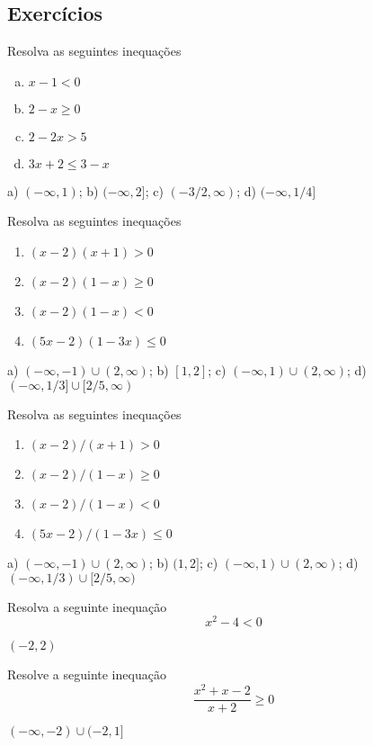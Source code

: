 \subsection*{Exercícios}

\begin{exer}
  Resolva as seguintes inequações
  \begin{enumerate}[a)]
  \item $x - 1 < 0$
  \item $2 - x \geq 0$
  \item $2 - 2x > 5$
  \item $3x + 2 \leq 3 - x$
  \end{enumerate}
\end{exer}
\begin{resp}
  a) $(-\infty, 1)$; b) $(-\infty, 2]$; c) $(-3/2, \infty)$; d) $(-\infty, 1/4]$
\end{resp}

\begin{exer}
  Resolva as seguintes inequações
  \begin{enumerate}
  \item $(x-2)(x+1) > 0$
  \item $(x-2)(1-x) \geq 0$
  \item $(x-2)(1-x) < 0$
  \item $(5x-2)(1-3x) \leq 0$
  \end{enumerate}
\end{exer}
\begin{resp}
  a) $(-\infty,-1)\cup (2,\infty)$; b) $[1,2]$; c) $(-\infty,1)\cup (2,\infty)$; d) $(-\infty,1/3]\cup [2/5,\infty)$
\end{resp}

\begin{exer}
  Resolva as seguintes inequações
  \begin{enumerate}
  \item $(x-2)/(x+1) > 0$
  \item $(x-2)/(1-x) \geq 0$
  \item $(x-2)/(1-x) < 0$
  \item $(5x-2)/(1-3x) \leq 0$
  \end{enumerate}
\end{exer}
\begin{resp}
  a) $(-\infty,-1)\cup (2,\infty)$; b) $(1,2]$; c) $(-\infty,1)\cup (2,\infty)$; d) $(-\infty,1/3)\cup [2/5,\infty)$
\end{resp}

\begin{exer}
  Resolva a seguinte inequação
  \begin{equation}
    x^2 - 4 < 0
  \end{equation}
\end{exer}
\begin{resp}
  $(-2,2)$
\end{resp}

\begin{exer}
  Resolve a seguinte inequação
  \begin{equation}
    \frac{x^2 + x - 2}{x+2} \geq 0
  \end{equation}
\end{exer}
\begin{resp}
  $(-\infty, -2)\cup (-2, 1]$
\end{resp}